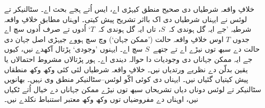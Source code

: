 \documentclass[../../../include/open-logic-section]{subfiles}
\begin{document}
خلافِ واقعہ شرطیاں دی صحیح منطق کیہڑی اے، ایس اُتے ہجے بحث اے۔
سٹالنیکر تے لوئس نے ایہناں شرطیاں دی اک بااثر تشریح پیش کیتی۔
اوہناں مطابق خلافِ واقعہ شرطیہ ’جے ایہ گل ہوندی کہ~$S$، تاں ایہ گل
ہوندی کہ~$T$‘ اُدوں تے صرف اُدوں سچ اے جدوں $T$ اوس خلافِ واقعہ حالت
(’ممکن جہان‘) وچ سچ ہووے جیہڑی اصل جہان دی حالت دے سبھ توں نیڑے اے
تے جتھے~$S$ سچ اے۔ ایہنوں ’وجودی‘ پڑتال آکھدے نیں، کیوں جے ایہ ممکن
جہاناں دی وجودیات دا حوالہ دیندی اے۔ ہور پڑتالاں مشروط احتمالاں یا
یقین بدلّن دے نظریے ورتدیاں نیں۔ خلافِ واقعہ شرطیاں لئی کئی وکھ وکھ
منطقاں پیش کیتیاں گئیاں نیں۔ ایہناں دی کوئی اکّو لوئس--سٹالنیکر منطق وی
نہیں۔ بھانویں سٹالنیکر تے لوئس دوناں دیاں تشریحاں سبھ توں نیڑے ممکن جہاناں
دے خیال اُتے ٹکیاں نیں، اوہناں دے مفروضیاں توں وکھ وکھ معتبر استنباط
نکلدے نیں۔
\end{document}
